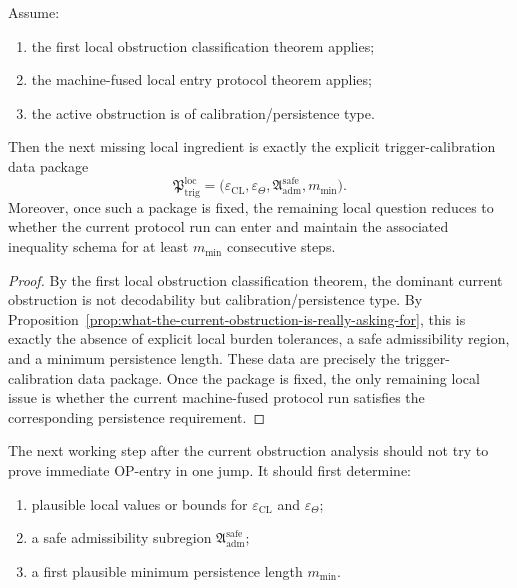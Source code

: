\begin{theorem}
\label{thm:first-local-trigger-calibration-theorem}
Assume:
\begin{enumerate}
 \item the first local obstruction classification theorem applies;
 \item the machine-fused local entry protocol theorem applies;
 \item the active obstruction is of calibration/persistence type.
\end{enumerate}
Then the next missing local ingredient is exactly the explicit trigger-calibration data package
\[
\mathfrak{P}_{\mathrm{trig}}^{\mathrm{loc}}
=
\bigl(
\varepsilon_{\mathrm{CL}},
\varepsilon_{\Theta},
\mathfrak{A}_{\mathrm{adm}}^{\mathrm{safe}},
 m_{\min}
\bigr).
\]
Moreover, once such a package is fixed, the remaining local question reduces to whether the current protocol run can enter and maintain the associated inequality schema for at least \(m_{\min}\) consecutive steps.
\end{theorem}

\begin{proof}
By the first local obstruction classification theorem, the dominant current obstruction is not decodability but calibration/persistence type.
By Proposition~\ref{prop:what-the-current-obstruction-is-really-asking-for}, this is exactly the absence of explicit local burden tolerances, a safe admissibility region, and a minimum persistence length.
These data are precisely the trigger-calibration data package.
Once the package is fixed, the only remaining local issue is whether the current machine-fused protocol run satisfies the corresponding persistence requirement.
\end{proof}

\begin{corollary}
\label{cor:next-post-r14-working-rule}
The next working step after the current obstruction analysis should not try to prove immediate OP-entry in one jump.
It should first determine:
\begin{enumerate}
 \item plausible local values or bounds for \(\varepsilon_{\mathrm{CL}}\) and \(\varepsilon_{\Theta}\);
 \item a safe admissibility subregion \(\mathfrak{A}_{\mathrm{adm}}^{\mathrm{safe}}\);
 \item a first plausible minimum persistence length \(m_{\min}\).
\end{enumerate}
\end{corollary}


